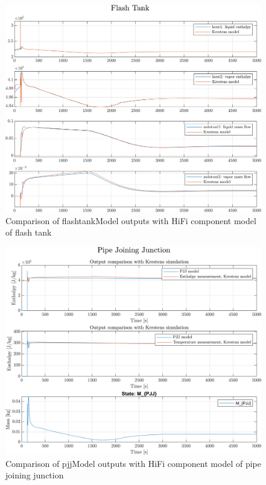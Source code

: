 \begin{figure}[h]
	\centering
	\includegraphics[width=1\textwidth]{Graphics/comp_test_ft.png}
	\caption{Comparison of flashtankModel outputs with HiFi component model of flash tank}
	\label{fig:component_test_ft}
\end{figure}
\begin{figure}[h]
	\centering
	\includegraphics[width=1\textwidth]{Graphics/comp_test_pjj.png}
	\caption{Comparison of pjjModel outputs with HiFi component model of pipe joining junction}
	\label{fig:component_test_pjj}
\end{figure}
